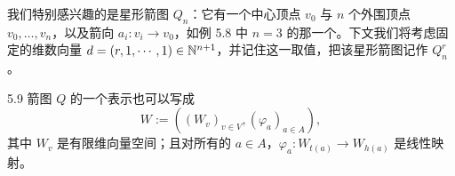 我们特别感兴趣的是星形箭图 $Q_n$：它有一个中心顶点 $v_0$ 与 $n$ 个外围顶点 $v_0,\dots,v_n$，以及箭向 $a_i : v_i\to v_0$，如例 5.8 中 $n=3$ 的那一个。下文我们将考虑固定的维数向量 $d=(r,1,\cdots,1)\in\mathbb{N}^{n+1}$，并记住这一取值，把该星形箭图记作 $Q^r_n$。


\begin{rem}{5.9}
箭图 $Q$ 的一个表示也可以写成
\[
W := ((W_v)_{v\in V},(\varphi_a)_{a\in A}),
\]
其中 $W_v$ 是有限维向量空间；且对所有的 $a\in A$，$\varphi_a : W_{t(a)}\to W_{h(a)}$ 是线性映射。
\end{rem}
